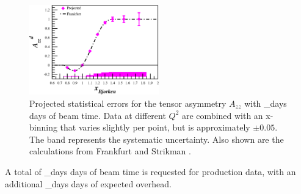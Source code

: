 \begin{figure}
\begin{center}
\includegraphics[width=0.5\textwidth]{figs/kine/Pzz_30_Azz_nobars.eps} 
\caption{\label{PROJ}Projected statistical errors for the tensor asymmetry $A_{zz}$ with \production_days days of beam time. Data at different $Q^2$ are combined with an x-binning that varies slightly per point, but is approximately $\pm0.05$.    
The band represents the systematic uncertainty.
Also shown are the calculations from Frankfurt and Strikman \cite{Frankfurt:1988nt}.
}
\end{center}
\end{figure}

A
total of \production_days days of beam time is requested for production data, with an additional \overhead_days days of expected overhead.



\clearpage

%








\clearpage
